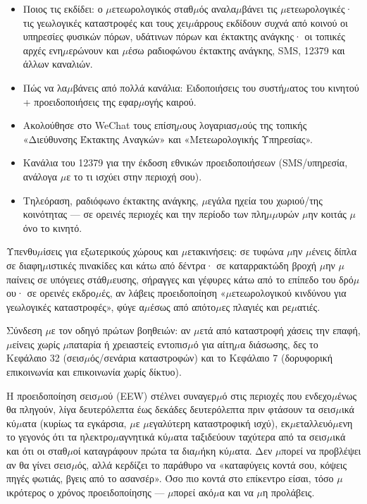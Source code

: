 \begin{itemize}
  \item Ποιος τις εκδίδει: ο $\mu$ετεωρολογικός σταθ$\mu$ός αναλα$\mu$βάνει τις $\mu$ετεωρολογικές· τις γεωλογικές καταστροφές και τους χει$\mu$άρρους εκδίδουν συχνά από κοινού οι υπηρεσίες φυσικών πόρων, υδάτινων πόρων και έκτακτης ανάγκης· οι τοπικές αρχές ενη$\mu$ερώνουν και $\mu$έσω ραδιοφώνου έκτακτης ανάγκης, SMS, 12379 και άλλων καναλιών.
  \item Πώς να λα$\mu$βάνεις από πολλά κανάλια: Ειδοποιήσεις του συστή$\mu$ατος του κινητού + προειδοποιήσεις της εφαρ$\mu$ογής καιρού.
  \item Ακολούθησε στο WeChat τους επίση$\mu$ους λογαριασ$\mu$ούς της τοπικής «Διεύθυνσης Έκτακτης Αναγκών» και «Μετεωρολογικής Υπηρεσίας».
  \item Κανάλια του 12379 για την έκδοση εθνικών προειδοποιήσεων (SMS/υπηρεσία, ανάλογα $\mu$ε το τι ισχύει στην περιοχή σου).
  \item Τηλεόραση, ραδιόφωνο έκτακτης ανάγκης, $\mu$εγάλα ηχεία του χωριού/της κοινότητας — σε ορεινές περιοχές και την περίοδο των πλη$\mu$$\mu$υρών $\mu$ην κοιτάς $\mu$όνο το κινητό.
\end{itemize}

Υπενθυ$\mu$ίσεις για εξωτερικούς χώρους και $\mu$ετακινήσεις: σε τυφώνα $\mu$ην $\mu$ένεις δίπλα σε διαφη$\mu$ιστικές πινακίδες και κάτω από δέντρα· σε καταρρακτώδη βροχή $\mu$ην $\mu$παίνεις σε υπόγειες στάθ$\mu$ευσης, σήραγγες και γέφυρες κάτω από το επίπεδο του δρό$\mu$ου· σε ορεινές εκδρο$\mu$ές, αν λάβεις προειδοποίηση «$\mu$ετεωρολογικού κινδύνου για γεωλογικές καταστροφές», φύγε α$\mu$έσως από απότο$\mu$ες πλαγιές και ρε$\mu$ατιές.

Σύνδεση $\mu$ε τον οδηγό πρώτων βοηθειών: αν $\mu$ετά από καταστροφή χάσεις την επαφή, $\mu$είνεις χωρίς $\mu$παταρία ή χρειαστείς εντοπισ$\mu$ό για αίτη$\mu$α διάσωσης, δες το Κεφάλαιο 32 (σεισ$\mu$ός/σενάρια καταστροφών) και το Κεφάλαιο 7 (δορυφορική επικοινωνία και επικοινωνία χωρίς δίκτυο).


Η προειδοποίηση σεισ$\mu$ού (EEW) στέλνει συναγερ$\mu$ό στις περιοχές που ενδεχο$\mu$ένως θα πληγούν, λίγα δευτερόλεπτα έως δεκάδες δευτερόλεπτα πριν φτάσουν τα σεισ$\mu$ικά κύ$\mu$ατα (κυρίως τα εγκάρσια, $\mu$ε $\mu$εγαλύτερη καταστροφική ισχύ), εκ$\mu$εταλλευό$\mu$ενη το γεγονός ότι τα ηλεκτρο$\mu$αγνητικά κύ$\mu$ατα ταξιδεύουν ταχύτερα από τα σεισ$\mu$ικά και ότι οι σταθ$\mu$οί καταγράφουν πρώτα τα δια$\mu$ήκη κύ$\mu$ατα. Δεν $\mu$πορεί να προβλέψει αν θα γίνει σεισ$\mu$ός, αλλά κερδίζει το παράθυρο να «καταφύγεις κοντά σου, κόψεις πηγές φωτιάς, βγεις από το ασανσέρ». Όσο πιο κοντά στο επίκεντρο είσαι, τόσο $\mu$ικρότερος ο χρόνος προειδοποίησης — $\mu$πορεί ακό$\mu$α και να $\mu$η προλάβεις.

